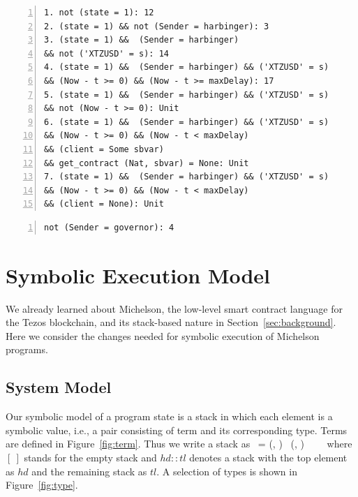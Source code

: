 \documentclass[a4paper,USenglish,cleveref, autoref,anonymous]{lipics-v2021}
\begin{document}
\begin{lstlisting}[float=tp,captionpos=b,caption={Failwith condition for the entrypoint setXtzUsdPrice\_callback},label={lst:setXtzUsdPrice_callback},numbers=left]
1. not (state = 1): 12
2. (state = 1) && not (Sender = harbinger): 3
3. (state = 1) &&  (Sender = harbinger) 
&& not ('XTZUSD' = s): 14
4. (state = 1) &&  (Sender = harbinger) && ('XTZUSD' = s)
&& (Now - t >= 0) && (Now - t >= maxDelay): 17
5. (state = 1) &&  (Sender = harbinger) && ('XTZUSD' = s)
&& not (Now - t >= 0): Unit
6. (state = 1) &&  (Sender = harbinger) && ('XTZUSD' = s)
&& (Now - t >= 0) && (Now - t < maxDelay) 
&& (client = Some sbvar) 
&& get_contract (Nat, sbvar) = None: Unit
7. (state = 1) &&  (Sender = harbinger) && ('XTZUSD' = s)
&& (Now - t >= 0) && (Now - t < maxDelay) 
&& (client = None): Unit
\end{lstlisting}

\begin{lstlisting}[float=tp,captionpos=b,caption={Failwith condition for the entrypoint setMaxDataDelaySec},label={lst:setMaxDataDelaySec},numbers=left]
not (Sender = governor): 4
\end{lstlisting}
\section{Symbolic Execution Model}
\label{sec:symbolic-execution-model}

We already learned about Michelson, the low-level smart contract
language for the Tezos blockchain, and its stack-based nature in
Section~\ref{sec:background}.  Here we consider the changes needed for
symbolic execution of Michelson programs.

\subsection{System Model}
\label{sec:system-model}

Our symbolic model of a program state is a stack in which each element
is a symbolic value, i.e., a pair consisting
of term and its corresponding type. Terms are defined in
Figure~\ref{fig:term}. Thus we write a stack as \STACK\ = (\TermOne,
\TYF) \STACKCONCAT\ (\TermTwo, \TYS) \STACKCONCAT\ \DOT\ \STACKCONCAT\ 
\EMPTYSTACK\ where \ensuremath{[\ ]} stands for the empty stack and
\ensuremath{hd :: tl} denotes a stack with the top element as
\ensuremath{hd} and the remaining stack as \ensuremath{tl}. 
A selection of types is shown in Figure~\ref{fig:type}.
\end{document}
